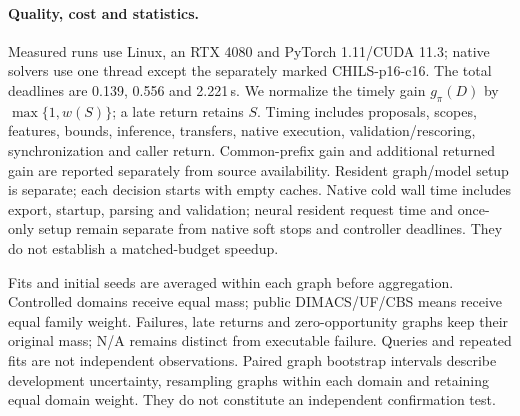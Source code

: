 \paragraph{Quality, cost and statistics.}
Measured runs use Linux, an RTX 4080 and PyTorch 1.11/CUDA 11.3;
native solvers use one thread except the separately marked CHILS-p16-c16.
The total deadlines are 0.139, 0.556 and 2.221\,s. We normalize the
timely gain $g_\pi(D)$ by $\max\{1,w(S)\}$; a late return retains $S$.
Timing includes
proposals, scopes, features, bounds, inference, transfers, native execution,
validation/rescoring, synchronization and caller return. Common-prefix gain and
additional returned gain are reported separately from source availability.
Resident graph/model setup is separate; each decision starts with empty
caches. Native cold wall time includes export, startup, parsing and validation;
neural resident request time and once-only setup remain separate from
native soft stops and controller deadlines. They do not establish a
matched-budget speedup.

Fits and initial seeds are averaged within each graph before aggregation.
Controlled domains receive equal mass; public DIMACS/UF/CBS means receive
equal family weight. Failures, late returns and zero-opportunity graphs keep
their original mass; N/A remains distinct from executable failure.
Queries and repeated fits are not independent observations. Paired graph
bootstrap intervals describe development uncertainty, resampling graphs
within each domain and retaining equal domain weight. They do not constitute
an independent confirmation test.

